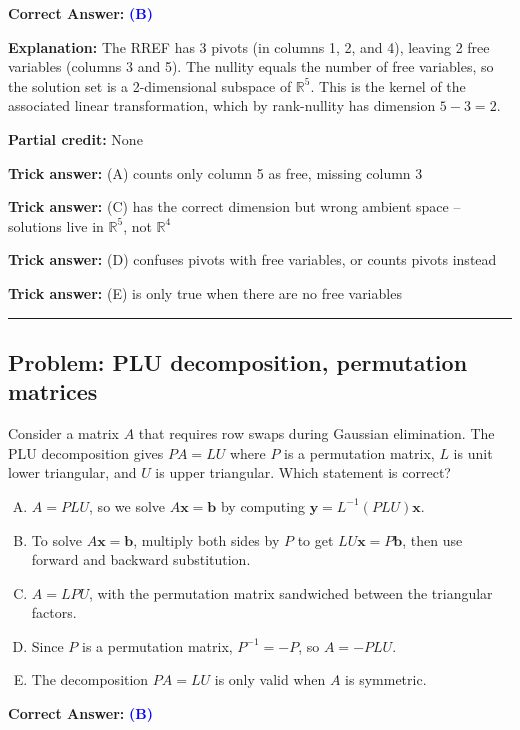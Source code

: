 \documentclass[12pt]{amsart}
\newcommand{\divider}{
  \vspace{-1em}
  \noindent
  \raisebox{-0.15ex}{\textbullet}%
  \hspace{0.5em}%
  \rule[0.5ex]{0.95\textwidth}{1.0pt}%
  \hspace{0.5em}%
  \raisebox{-0.15ex}{\textbullet}%
  \vspace{0em}
}
\begin{document}
\textbf{Correct Answer:} \textcolor{blue}{\textbf{(B)}}

\textbf{Explanation:} The RREF has 3 pivots (in columns 1, 2, and 4), leaving 2 free variables (columns 3 and 5). The nullity equals the number of free variables, so the solution set is a 2-dimensional subspace of $\mathbb{R}^5$. This is the kernel of the associated linear transformation, which by rank-nullity has dimension $5 - 3 = 2$.

\textbf{Partial credit:} None

\textbf{Trick answer:} (A) counts only column 5 as free, missing column 3

\textbf{Trick answer:} (C) has the correct dimension but wrong ambient space -- solutions live in $\mathbb{R}^5$, not $\mathbb{R}^4$

\textbf{Trick answer:} (D) confuses pivots with free variables, or counts pivots instead

\textbf{Trick answer:} (E) is only true when there are no free variables

\divider

\subsection*{Problem: PLU decomposition, permutation matrices}

Consider a matrix $A$ that requires row swaps during Gaussian elimination. The PLU decomposition gives $PA = LU$ where $P$ is a permutation matrix, $L$ is unit lower triangular, and $U$ is upper triangular. Which statement is correct?

\begin{enumerate}[(A)]
\item $A = PLU$, so we solve $A\mathbf{x} = \mathbf{b}$ by computing $\mathbf{y} = L^{-1}(PLU)\mathbf{x}$.
\item To solve $A\mathbf{x} = \mathbf{b}$, multiply both sides by $P$ to get $LU\mathbf{x} = P\mathbf{b}$, then use forward and backward substitution.
\item $A = LPU$, with the permutation matrix sandwiched between the triangular factors.
\item Since $P$ is a permutation matrix, $P^{-1} = -P$, so $A = -PLU$.
\item The decomposition $PA = LU$ is only valid when $A$ is symmetric.
\end{enumerate}

\textbf{Correct Answer:} \textcolor{blue}{\textbf{(B)}}
\end{document}
